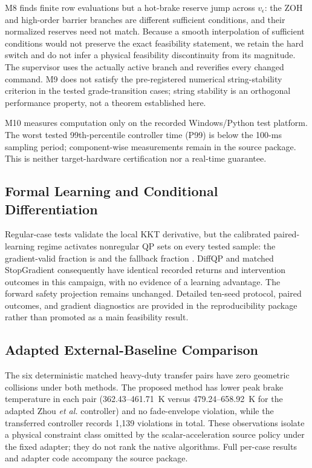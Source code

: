 M8 finds finite row evaluations but a hot-brake reserve jump across $v_\epsilon$: the ZOH and high-order barrier branches are different sufficient conditions, and their normalized reserves need not match. Because a smooth interpolation of sufficient conditions would not preserve the exact feasibility statement, we retain the hard switch and do not infer a physical feasibility discontinuity from its magnitude. The supervisor uses the actually active branch and reverifies every changed command. M9 does not satisfy the pre-registered numerical string-stability criterion in the tested grade-transition cases; string stability is an orthogonal performance property, not a theorem established here.

M10 measures computation only on the recorded Windows/Python test platform. The worst tested 99th-percentile controller time (P99) is below the 100-ms sampling period; component-wise measurements remain in the source package. This is neither target-hardware certification nor a real-time guarantee.

\subsection{Formal Learning and Conditional Differentiation}
Regular-case tests validate the local KKT derivative, but the calibrated paired-learning regime activates nonregular QP sets on every tested sample: the gradient-valid fraction is \FinalGradientValid{} and the fallback fraction \FinalFallback{}. DiffQP and matched StopGradient consequently have identical recorded returns and intervention outcomes in this campaign, with no evidence of a learning advantage. The forward safety projection remains unchanged. Detailed ten-seed protocol, paired outcomes, and gradient diagnostics are provided in the reproducibility package rather than promoted as a main feasibility result.

\subsection{Adapted External-Baseline Comparison}
The six deterministic matched heavy-duty transfer pairs have zero geometric collisions under both methods. The proposed method has lower peak brake temperature in each pair (362.43--461.71~K versus 479.24--658.92~K for the adapted Zhou \emph{et al.} controller) and no fade-envelope violation, while the transferred controller records 1,139 violations in total. These observations isolate a physical constraint class omitted by the scalar-acceleration source policy under the fixed adapter; they do not rank the native algorithms. Full per-case results and adapter code accompany the source package.

